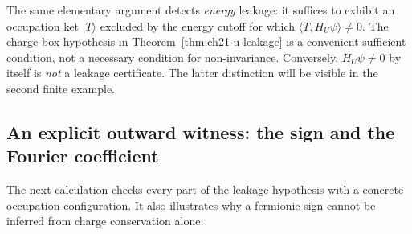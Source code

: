 The same elementary argument detects \emph{energy} leakage: it suffices
to exhibit an occupation ket \(|T\rangle\) excluded by the energy
cutoff for which \(\langle T,H_U\psi\rangle\ne0\).
The charge-box hypothesis in Theorem~\ref{thm:ch21-u-leakage} is a
convenient sufficient condition, not a necessary condition for
non-invariance.  Conversely, \(H_U\psi\ne0\) by itself is
\emph{not} a leakage certificate.  The latter distinction will be
visible in the second finite example.

\subsection*{An explicit outward witness: the sign and the Fourier coefficient}

The next calculation checks every part of the leakage hypothesis with
a concrete occupation configuration.  It also illustrates why a
fermionic sign cannot be inferred from charge conservation alone.

